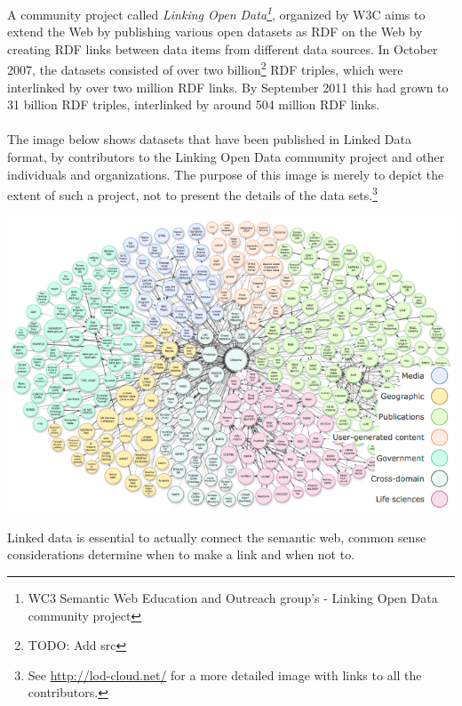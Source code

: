 A community project called \textit{Linking Open Data\footnote{WC3 Semantic Web Education and Outreach group's - Linking Open Data community project}}, organized by W3C aims to extend the Web by publishing various open datasets as RDF on the Web by creating RDF links between data items from different data sources. In October 2007, the datasets consisted of over two billion\footnote{TODO: Add src} RDF triples, which were interlinked by over two million RDF links. By September 2011 this had grown to 31 billion RDF triples, interlinked by around 504 million RDF links.\\\\
The image below shows datasets that have been published in Linked Data format, by contributors to the Linking Open Data community project and other individuals and organizations. The purpose of this image is merely to depict the extent of such a project, not to present the details of the data sets.\footnote{See \url{http://lod-cloud.net/} for a more detailed image with links to all the contributors.}
\begin{center}
\includegraphics[scale=0.6]{../imgs/lod-datasets.png}
\end{center}
Linked data is essential to actually connect the semantic web, common sense considerations determine when to make a link and when not to.

